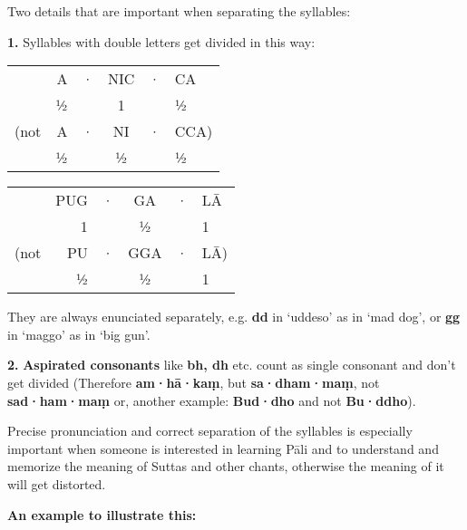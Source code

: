Two details that are important when separating the syllables:

\textbf{1.} Syllables with double letters get divided in this way:

\begin{centering}

\begin{minipage}{0.8\linewidth}
\fontsize{8}{13}\selectfont
\begin{multicols}{2}
\setlength{\tabcolsep}{1.8pt}%

\begin{tabular}{@{} rrcccl @{}}
     & A & · & NIC & · & CA   \\
     & ½ &   &  1  &   & ½    \\
(not & A & · & NI  & · & CCA) \\
     & ½ &   & ½   &   & ½    \\
\end{tabular}

\columnbreak

\begin{tabular}{@{} rrcccl @{}}
     & PUG & · & GA  & · & LĀ \\
     &  1  &   &  ½  &   &  1 \\
(not & PU  & · & GGA & · & LĀ)\\
     &  ½  &   &  ½  &   &  1 \\
\end{tabular}

\end{multicols}
\end{minipage}

\end{centering}

They are always enunciated separately, e.g. \textbf{dd} in ‘uddeso’ as
in ‘mad dog’, or \textbf{gg} in ‘maggo’ as in ‘big gun’.

\textbf{2.} \textbf{Aspirated consonants} like \textbf{bh, dh} etc.
count as single consonant and don't get divided (Therefore
\textbf{am·hā·kaṃ}, but \textbf{sa·dham·maṃ}, not \textbf{sad·ham·maṃ}
or, another example: \textbf{Bud·dho} and not \textbf{Bu·ddho}).

Precise pronunciation and correct separation of the syllables is
especially important when someone is interested in learning Pāli and to
understand and memorize the meaning of Suttas and other chants,
otherwise the meaning of it will get distorted.

\textbf{An example to illustrate this:}

